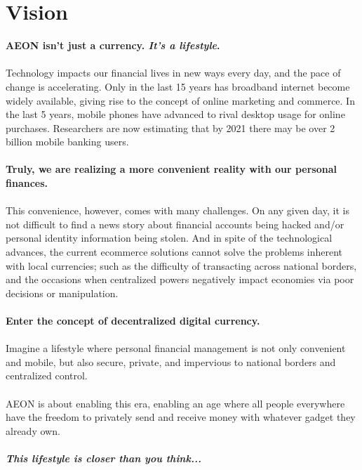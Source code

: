 
\section{Vision}
	
	\textbf{AEON isn't just a currency.  \textit{It's a lifestyle}.}\\
	\\
	Technology impacts our financial lives in new ways every day, and the pace of change is accelerating. Only in the last 15 years has broadband internet become widely available, giving rise to the concept of online marketing and commerce. In the last 5 years, mobile phones have advanced to rival desktop usage for online purchases.  Researchers are now estimating that by 2021 there may be over 2 billion mobile banking users.\\
	\\
	\textbf{Truly, we are realizing a more convenient reality with our personal finances.}\\
	\\
	This convenience, however, comes with many challenges. On any given day, it is not difficult to find a news story about financial accounts being hacked and/or personal identity information being stolen.  And in spite of the technological advances, the current ecommerce solutions cannot solve the problems inherent with local currencies; such as the difficulty of transacting across national borders, and the occasions when centralized powers negatively impact economies via poor decisions or manipulation.\\
	\\
	\textbf{Enter the concept of decentralized digital currency.}\\
	\\
	Imagine a lifestyle where personal financial management is not only convenient and mobile, but also secure, private, and impervious to national borders and centralized control.\\
	\\
	AEON is about enabling this era, enabling an age where all people everywhere have the freedom to privately send and receive money with whatever gadget they already own.\\
	\\
	\textbf{\textit{This lifestyle is closer than you think...}}\\
	
